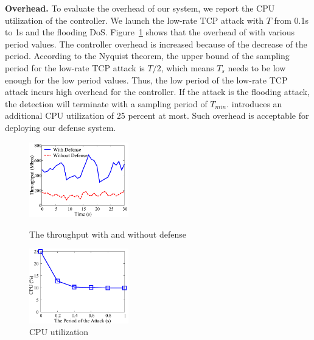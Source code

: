 \noindent \textbf{Overhead.} To evaluate the overhead of our system, we report the CPU utilization of the controller. We launch the low-rate TCP attack with $T$ from 0.1s to 1s and the flooding DoS. Figure~\ref{fig:utilizaition} shows that the overhead of \TheName{} with various period values. The controller overhead is increased because of the decrease of the period. According to the Nyquist theorem, the upper bound of the sampling period for the low-rate TCP attack is $T/2$, which means $T_s$ needs to be low enough for the low period values. Thus, the low period of the low-rate TCP attack incurs high overhead for the controller. If the attack is the flooding attack, the detection will terminate with a sampling period of $T_{min}$. \TheName{} introduces an additional CPU utilization of 25 percent at most. Such overhead is acceptable for deploying our defense system.

\begin{figure}
\begin{minipage}[t]{0.49\linewidth}
\centering
\includegraphics[width=1.7in]{Evaluation/throughput.pdf}
\caption{\small{The throughput with and without defense }}
\label{fig:throughput}
\end{minipage}
\begin{minipage}[t]{0.49\linewidth}
\centering
\includegraphics[width=1.7in]{Evaluation/utilizaition.pdf}
\caption{\small{CPU utilization}}
\label{fig:utilizaition}
\end{minipage}
\vspace{-0.2in}
\end{figure}


